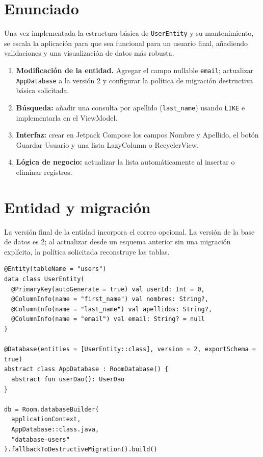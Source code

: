 \documentclass[12pt,a4paper,oneside]{report}
\begin{document}
\section{Enunciado}
Una vez implementada la estructura básica de \texttt{UserEntity} y su
mantenimiento, se escala la aplicación para que sea funcional para un usuario
final, añadiendo validaciones y una visualización de datos más robusta.

\begin{enumerate}
  \item \textbf{Modificación de la entidad.}
  Agregar el campo nullable \texttt{email}; actualizar \texttt{AppDatabase} a la
  versión 2 y configurar la política de migración destructiva básica solicitada.
  \item \textbf{Búsqueda:} añadir una consulta por apellido (\texttt{last\_name})
  usando \texttt{LIKE} e implementarla en el ViewModel.
  \item \textbf{Interfaz:} crear en Jetpack Compose los campos Nombre y Apellido,
  el botón Guardar Usuario y una lista LazyColumn o RecyclerView.
  \item \textbf{Lógica de negocio:} actualizar la lista automáticamente al insertar
  o eliminar registros.
\end{enumerate}

\section{Entidad y migración}
La versión final de la entidad incorpora el correo opcional. La versión de la base
de datos es 2; al actualizar desde un esquema anterior sin una migración explícita,
la política solicitada reconstruye las tablas.

\begin{lstlisting}
@Entity(tableName = "users")
data class UserEntity(
  @PrimaryKey(autoGenerate = true) val userId: Int = 0,
  @ColumnInfo(name = "first_name") val nombres: String?,
  @ColumnInfo(name = "last_name") val apellidos: String?,
  @ColumnInfo(name = "email") val email: String? = null
)

@Database(entities = [UserEntity::class], version = 2, exportSchema = true)
abstract class AppDatabase : RoomDatabase() {
  abstract fun userDao(): UserDao
}

db = Room.databaseBuilder(
  applicationContext,
  AppDatabase::class.java,
  "database-users"
).fallbackToDestructiveMigration().build()
\end{lstlisting}
\end{document}
